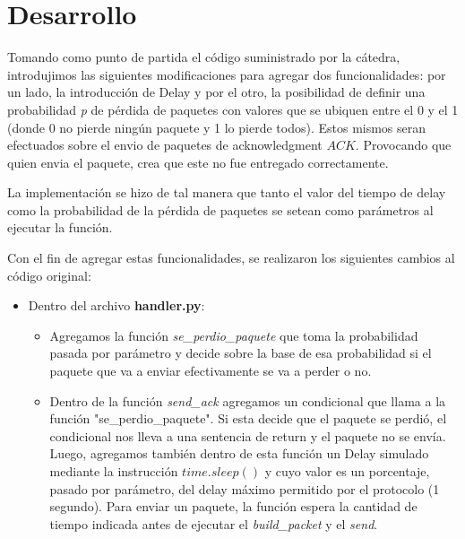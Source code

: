 \section{Desarrollo}

Tomando como punto de partida el c\'odigo suministrado por la cátedra, introdujimos las siguientes modificaciones para agregar dos funcionalidades: por un lado, la introducción de Delay y por el otro, la posibilidad de definir una probabilidad \textit{p} de pérdida de paquetes con valores que se ubiquen entre el 0 y el 1 (donde 0 no pierde ningún paquete y 1 lo pierde todos). Estos mismos seran efectuados sobre el envio de paquetes de acknowledgment $ACK$. Provocando que quien envia el paquete, crea que este no fue entregado correctamente.

La implementación se hizo de tal manera que tanto el valor del tiempo de delay como la probabilidad de la p\'erdida de paquetes se setean como par\'ametros al ejecutar la funci\'on.

Con el fin de agregar estas funcionalidades, se realizaron los siguientes cambios al c\'odigo original:

\begin{itemize}

\item Dentro del archivo \textbf{handler.py}:

\begin{itemize}

\item Agregamos la funci\'on \textit{se\_perdio\_paquete} que toma la probabilidad pasada por parámetro y decide sobre la base de esa probabilidad si el paquete que va a enviar efectivamente se va a perder o no.

\item Dentro de la función \textit{send\_ack} agregamos un condicional que llama a la función "se\_perdio\_paquete".
Si esta decide que el paquete se perdió, el condicional nos lleva a una sentencia de return y el paquete no se envía.
Luego, agregamos también dentro de esta función un Delay simulado mediante la instrucción $time.sleep()$ y cuyo valor es un porcentaje, pasado por par\'ametro, del delay m\'aximo permitido por el protocolo (1 segundo). Para enviar un paquete, la función espera la cantidad de tiempo indicada antes de ejecutar el \textit{build\_packet} y el \textit{send}.

\end{itemize}
\end{itemize}

